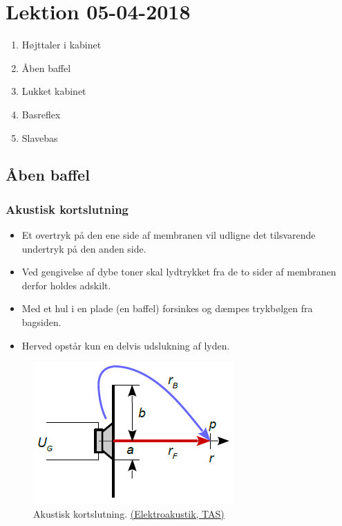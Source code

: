 \section{Lektion 05-04-2018}

\begin{enumerate}
	\item Højttaler i kabinet
	\item Åben baffel
	\item Lukket kabinet
	\item Basreflex
	\item Slavebas
\end{enumerate}

\noindent{} \vspace{3mm}

\subsection{Åben baffel}

\subsubsection{Akustisk kortslutning}
\begin{itemize}
	\item Et overtryk på den ene side af membranen vil udligne det tilsvarende undertryk på den anden side.
	\item Ved gengivelse af dybe toner skal lydtrykket fra de to sider af membranen derfor holdes adskilt.
	\item Med et hul i en plade (en baffel) forsinkes og
	dæmpes trykbølgen fra bagsiden.
	\item Herved opstår kun en delvis udslukning af lyden.
\end{itemize}

\begin{figure} [H]
	\centering
	\includegraphics[width=0.5\linewidth]{graphics/53.png}
	\caption{Akustisk kortslutning. \href{http://www.torean.dk/artikel/Elektroakustik.pdf}{(Elektroakustik, TAS)}}
	\label{fig:53}
\end{figure}


